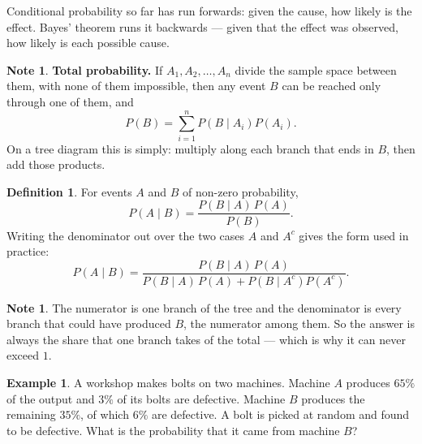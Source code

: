 \documentclass[11pt,a4paper]{article}
\theoremstyle{definition}
\newtheorem{definition}[thm]{Definition}
\newtheorem{example}[thm]{Example}
\newtheorem{note}[thm]{Note}
\begin{document}
Conditional probability so far has run forwards: given the cause, how likely is the
effect. Bayes' theorem runs it backwards --- given that the effect was observed, how
likely is each possible cause.

\begin{note}
\textbf{Total probability.} If $A_1,A_2,\ldots,A_n$ divide the sample space between
them, with none of them impossible, then any event $B$ can be reached only through one
of them, and
$$P(B)=\sum_{i=1}^{n}P\left(B\mid A_i\right)P\left(A_i\right).$$
On a tree diagram this is simply: multiply along each branch that ends in $B$, then add
those products.
\end{note}

\begin{definition}
For events $A$ and $B$ of non-zero probability,
$$P(A\mid B)=\frac{P(B\mid A)\,P(A)}{P(B)}.$$
Writing the denominator out over the two cases $A$ and $A^c$ gives the form used in
practice:
$$P(A\mid B)=\frac{P(B\mid A)\,P(A)}
{P(B\mid A)\,P(A)+P\left(B\mid A^c\right)P\left(A^c\right)}.$$
\end{definition}

\begin{note}
The numerator is one branch of the tree and the denominator is every branch that could
have produced $B$, the numerator among them. So the answer is always the share that one
branch takes of the total --- which is why it can never exceed $1$.
\end{note}

\begin{example}
A workshop makes bolts on two machines. Machine $A$ produces $65\%$ of the output and
$3\%$ of its bolts are defective. Machine $B$ produces the remaining $35\%$, of which
$6\%$ are defective. A bolt is picked at random and found to be defective. What is the
probability that it came from machine $B$?
\end{example}
\end{document}
